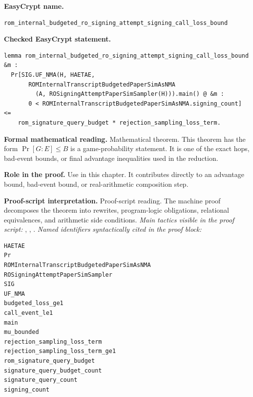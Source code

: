 \begin{formaltheorem}
\noindent\textbf{EasyCrypt name.}
\begin{lstlisting}[language=EasyCrypt,basicstyle=\ttfamily\scriptsize]
rom_internal_budgeted_ro_signing_attempt_signing_call_loss_bound
\end{lstlisting}
\noindent\textbf{Checked EasyCrypt statement.}
\begin{lstlisting}[language=EasyCrypt,basicstyle=\ttfamily\scriptsize]
lemma rom_internal_budgeted_ro_signing_attempt_signing_call_loss_bound &m :
  Pr[SIG.UF_NMA(H, HAETAE,
       ROMInternalTranscriptBudgetedPaperSimAsNMA
         (A, ROSigningAttemptPaperSimSampler(H))).main() @ &m :
       0 < ROMInternalTranscriptBudgetedPaperSimAsNMA.signing_count] <=
    rom_signature_query_budget * rejection_sampling_loss_term.
\end{lstlisting}
\noindent\textbf{Formal mathematical reading.}
Mathematical theorem. This theorem has the form \(\Pr[G:E] \le B\) is a game-probability statement.  It is one of the exact hops, bad-event bounds, or final advantage inequalities used in the reduction.

\noindent\textbf{Role in the proof.}
Use in this chapter. It contributes directly to an advantage bound, bad-event bound, or real-arithmetic composition step.

\noindent\textbf{Proof-script interpretation.}
Proof-script reading. The machine proof decomposes the theorem into rewrites, program-logic obligations, relational equivalences, and arithmetic side conditions.
\emph{Main tactics visible in the proof script:} , , .
\emph{Named identifiers syntactically cited in the proof block:}
\begin{lstlisting}[language=EasyCrypt,basicstyle=\ttfamily\scriptsize]
HAETAE
Pr
ROMInternalTranscriptBudgetedPaperSimAsNMA
ROSigningAttemptPaperSimSampler
SIG
UF_NMA
budgeted_loss_ge1
call_event_le1
main
mu_bounded
rejection_sampling_loss_term
rejection_sampling_loss_term_ge1
rom_signature_query_budget
signature_query_budget_count
signature_query_count
signing_count
\end{lstlisting}

\end{formaltheorem}

